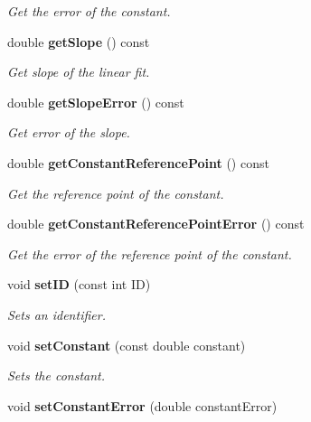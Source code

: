 \begin{DoxyCompactItemize}
\begin{DoxyCompactList}\small\item\em Get the error of the constant. \end{DoxyCompactList}\item 
double {\bf get\-Slope} () const \label{classCALICE_1_1LinearFitCompound_adb11c7794278351a448df3bff3a0bd07}

\begin{DoxyCompactList}\small\item\em Get slope of the linear fit. \end{DoxyCompactList}\item 
double {\bf get\-Slope\-Error} () const \label{classCALICE_1_1LinearFitCompound_a19e287bdba39f38751496a5b06f28569}

\begin{DoxyCompactList}\small\item\em Get error of the slope. \end{DoxyCompactList}\item 
double {\bf get\-Constant\-Reference\-Point} () const \label{classCALICE_1_1LinearFitCompound_a72a91d14525eedaa7f2f436f6c7fe51e}

\begin{DoxyCompactList}\small\item\em Get the reference point of the constant. \end{DoxyCompactList}\item 
double {\bf get\-Constant\-Reference\-Point\-Error} () const \label{classCALICE_1_1LinearFitCompound_a77547513303b8e9df5329c5dd67571ac}

\begin{DoxyCompactList}\small\item\em Get the error of the reference point of the constant. \end{DoxyCompactList}\item 
void {\bf set\-I\-D} (const int I\-D)\label{classCALICE_1_1LinearFitCompound_af7dcd74ed57f41b64c7ba082c8070246}

\begin{DoxyCompactList}\small\item\em Sets an identifier. \end{DoxyCompactList}\item 
void {\bf set\-Constant} (const double constant)\label{classCALICE_1_1LinearFitCompound_a144ad1196e206d632f000939097d80aa}

\begin{DoxyCompactList}\small\item\em Sets the constant. \end{DoxyCompactList}\item 
void {\bf set\-Constant\-Error} (double constant\-Error)\label{classCALICE_1_1LinearFitCompound_aa990f347871e140731ae76b27277efc7}


\end{DoxyCompactItemize}
